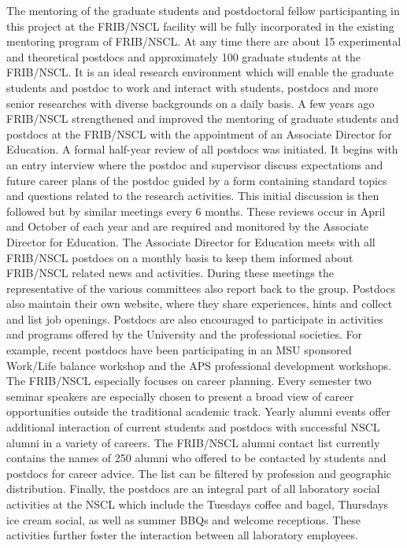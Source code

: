 \documentclass[10pt]{article}
\begin{document}
The mentoring of the graduate students and postdoctoral fellow 
participanting in this project at the 
FRIB/NSCL facility will be fully incorporated in the existing
mentoring program of FRIB/NSCL. At any time there are about 15
experimental and theoretical postdocs and approximately 100 graduate
students at the FRIB/NSCL. It is an ideal research environment which
will enable the graduate students and postdoc to work and interact
with students, postdocs and more senior researches with diverse
backgrounds on a daily basis. A few years ago FRIB/NSCL strengthened
and improved the mentoring of graduate students and postdocs at the
FRIB/NSCL with the appointment of an Associate Director for
Education. A formal half-year review of all postdocs was initiated. It
begins with an entry interview where the postdoc and supervisor
discuss expectations and future career plans of the postdoc guided by
a form containing standard topics and questions related to the
research activities. This initial discussion is then followed but by
similar meetings every 6 months. These reviews occur in April and
October of each year and are required and monitored by the Associate
Director for Education.  The Associate Director for Education meets
with all FRIB/NSCL postdocs on a monthly basis to keep them informed
about FRIB/NSCL related news and activities. During these meetings the
representative of the various committees also report back to the
group. Postdocs also maintain their own website, where they share
experiences, hints and collect and list job openings. Postdocs are
also encouraged to participate in activities and programs offered by
the University and the professional societies. For example, recent
postdocs have been participating in an MSU sponsored Work/Life balance
workshop and the APS professional development workshops. The FRIB/NSCL
especially focuses on career planning. Every semester two seminar
speakers are especially chosen to present a broad view of career
opportunities outside the traditional academic track. Yearly alumni
events offer additional interaction of current students and postdocs
with successful NSCL alumni in a variety of careers.  The FRIB/NSCL
alumni contact list currently contains the names of 250 alumni who
offered to be contacted by students and postdocs for career advice.  The list can be
filtered by profession and geographic distribution.  Finally, the
postdocs are an integral part of all laboratory social activities at
the NSCL which include the Tuesdays coffee and bagel, Thursdays ice
cream social, as well as summer BBQs and welcome receptions. These
activities further foster the interaction between all laboratory
employees.
\end{document}
